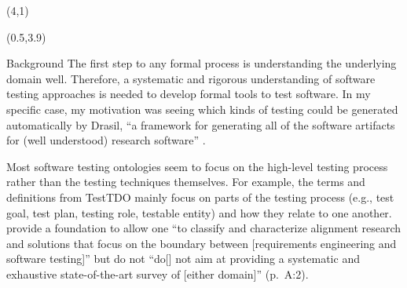 \documentclass[22pt]{beamer}
\begin{document}
\begin{frame}[fragile]
    \begin{textblock}{8}(4,1)
        \titlepage
    \end{textblock}

    \begin{textblock}{7.25}(0.5,3.9)

        \begin{block}{\fontsize{37}{20}\selectfont Background}
            The first step to any formal process is understanding the underlying
            domain well. Therefore, a systematic and rigorous understanding of
            software testing approaches is needed to develop formal tools to test
            software. In my specific case, my motivation was seeing which kinds
            of testing could be generated automatically by Drasil, ``a framework
            for generating all of the software artifacts for (well understood)
            research software'' \citep{carette_drasil_2021}.

            \quad %

            Most software testing ontologies seem to focus on the high-level
            testing process rather than the testing techniques themselves. For
            example, the terms and definitions \citep{TebesEtAl2020b} from
            TestTDO \citep{TebesEtAl2020a} mainly focus on parts of the testing
            process (e.g., test goal, test plan, testing role, testable entity)
            and how they relate to one another.
            \citet{UnterkalmsteinerEtAl2014} provide a foundation to allow one
            ``to classify and characterize alignment research and solutions
            that focus on the boundary between [requirements engineering and
                    software testing]'' but do not ``do[] not aim at providing a
            systematic and exhaustive state-of-the-art survey of [either domain]''
            (p.~A:2).
            \vspace{5mm}
        \end{block}


\end{textblock}
\end{frame}
\end{document}
